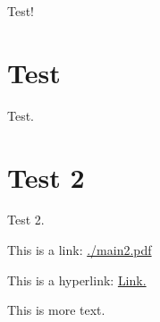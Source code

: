 \documentclass[12pt]{article}
\begin{document}
Test!
\section{Test}
Test.
\section{Test 2}
Test 2.

This is a link: \url{./main2.pdf}

This is a hyperlink: \href{./main2.pdf}{Link.}

This is more text.
\end{document}
